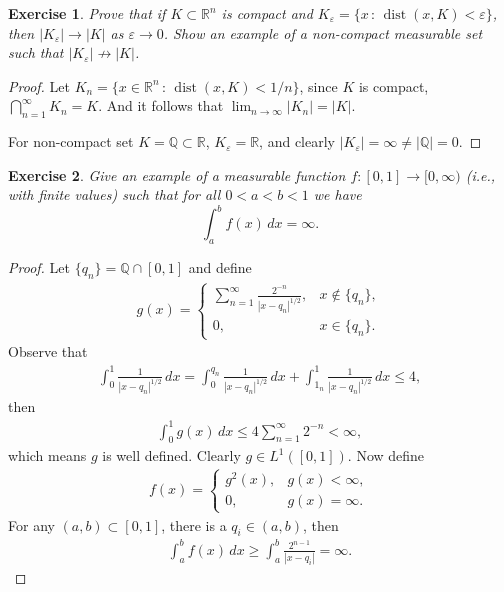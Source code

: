\documentclass[11pt]{book}
\newtheorem{exercise}{Exercise}[chapter]
\theoremstyle{definition}
\numberwithin{equation}{chapter}
\begin{document}
\begin{exercise}
Prove that if $K\subset\mathbb{R}^n$ is compact and $K_\varepsilon=\{x \,:\, \operatorname{dist}(x,K)<\varepsilon\}$, then $\left|K_\varepsilon\right| \to \left|K\right|$ as $\varepsilon\to 0$.
Show an example of a non-compact measurable set such that $\left|K_\varepsilon\right| \not\to \left|K\right|$.
\end{exercise}
\begin{proof}
Let $K_n = \{x \in \mathbb{R}^n \,:\, \operatorname{dist}(x,K) < 1/n\}$, since $K$ is compact, $\bigcap^\infty_{n=1} K_n = K$. And it follows that $\lim_{n\to\infty} \left|K_n\right| = \left|K\right|$.

For non-compact set $K = \mathbb{Q} \subset \mathbb{R}$, $K_\varepsilon = \mathbb{R}$, and clearly $\left|K_\varepsilon\right| = \infty \neq \left|\mathbb{Q}\right| = 0$.
\end{proof}

\medskip

\begin{exercise}
Give an example of a measurable function $f:[0,1]\to [0,\infty)$ (i.e., with finite values) such that for all $0<a<b<1$ we have
$$
\int_a^b f(x)\, dx = \infty.
$$
\end{exercise}
\begin{proof} 
Let $\{q_n\} = \mathbb{Q} \cap [0,1]$ and define
\begin{align*}
    g(x) = \begin{cases}
        \sum^\infty_{n=1} \frac{2^{-n}}{|x - q_n|^{1/2}}, & x \notin \{q_n\}, \\
        0, & x \in \{q_n\}.
    \end{cases}
\end{align*}
Observe that
\begin{align*}
    \int^1_0 \frac{1}{|x - q_n|^{1/2}}\, dx = \int^{q_n}_0 \frac{1}{|x - q_n|^{1/2}}\, dx + \int^1_{1_n} \frac{1}{|x - q_n|^{1/2}}\, dx \leq 4,
\end{align*}
then
\begin{align*}
    \int^1_0 g(x)\,dx \leq 4 \sum^\infty_{n=1} 2^{-n} < \infty,
\end{align*}
which means $g$ is well defined. Clearly $g \in L^1([0,1])$. Now define
\begin{align*}
    f(x) = \begin{cases}
        g^2(x), & g(x) < \infty, \\
        0, & g(x) = \infty.
    \end{cases}
\end{align*}
For any $(a,b) \subset [0,1]$, there is a $q_i \in (a,b)$, then
\begin{align*}
    \int^b_a f(x)\,dx \geq \int^b_a \frac{2^{n-1}}{|x - q_i|} =  \infty.
\end{align*}
\end{proof}
\end{document}
